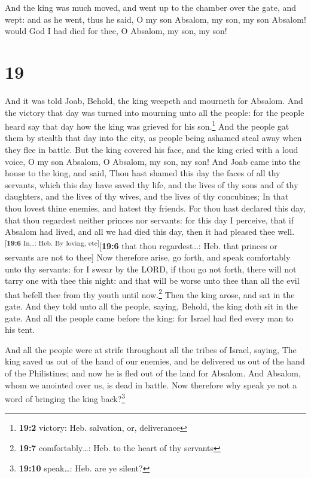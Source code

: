 And the king was much moved, and went up to the chamber
over the gate, and wept: and as he went, thus he said, O my son Absalom,
my son, my son Absalom! would God I had died for thee, O Absalom, my
son, my son!

\hypertarget{section-18}{%
\section{19}\label{section-18}}

 And it was told Joab, Behold, the king weepeth and
mourneth for Absalom.  And the victory that day was turned
into mourning unto all the people: for the people heard say that day how
the king was grieved for his son.\footnote{\textbf{19:2} victory: Heb.
  salvation, or, deliverance}  And the people gat them by
stealth that day into the city, as people being ashamed steal away when
they flee in battle.  But the king covered his face, and
the king cried with a loud voice, O my son Absalom, O Absalom, my son,
my son!  And Joab came into the house to the king, and
said, Thou hast shamed this day the faces of all thy servants, which
this day have saved thy life, and the lives of thy sons and of thy
daughters, and the lives of thy wives, and the lives of thy concubines;
 In that thou lovest thine enemies, and hatest thy
friends. For thou hast declared this day, that thou regardest neither
princes nor servants: for this day I perceive, that if Absalom had
lived, and all we had died this day, then it had pleased thee
well.\textsuperscript{{[}\textbf{19:6} In\ldots: Heb. By loving,
etc{]}}{[}\textbf{19:6} that thou regardest\ldots: Heb. that princes or
servants are not to thee{]}  Now therefore arise, go
forth, and speak comfortably unto thy servants: for I swear by the LORD,
if thou go not forth, there will not tarry one with thee this night: and
that will be worse unto thee than all the evil that befell thee from thy
youth until now.\footnote{\textbf{19:7} comfortably\ldots: Heb. to the
  heart of thy servants}  Then the king arose, and sat in
the gate. And they told unto all the people, saying, Behold, the king
doth sit in the gate. And all the people came before the king: for
Israel had fled every man to his tent.

 And all the people were at strife throughout all the
tribes of Israel, saying, The king saved us out of the hand of our
enemies, and he delivered us out of the hand of the Philistines; and now
he is fled out of the land for Absalom.  And Absalom,
whom we anointed over us, is dead in battle. Now therefore why speak ye
not a word of bringing the king back?\footnote{\textbf{19:10}
  speak\ldots: Heb. are ye silent?}

